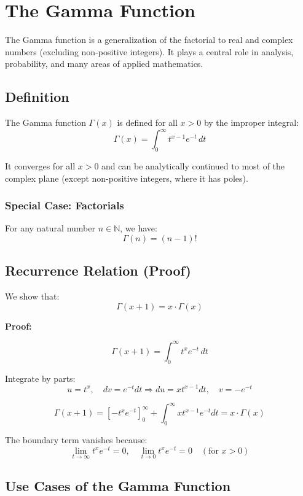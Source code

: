 \section{The Gamma Function}

The Gamma function is a generalization of the factorial to real and complex numbers (excluding non-positive integers). It plays a central role in analysis, probability, and many areas of applied mathematics.

\subsection{Definition}

The Gamma function \( \Gamma(x) \) is defined for all \( x > 0 \) by the improper integral:
\[
\Gamma(x) = \int_0^\infty t^{x-1} e^{-t} \,dt
\]

It converges for all \( x > 0 \) and can be analytically continued to most of the complex plane (except non-positive integers, where it has poles).

\subsubsection*{Special Case: Factorials}

For any natural number \( n \in \mathbb{N} \), we have:
\[
\Gamma(n) = (n - 1)!
\]

\subsection{Recurrence Relation (Proof)}

We show that:
\[
\Gamma(x + 1) = x \cdot \Gamma(x)
\]

\textbf{Proof:}

\[
\Gamma(x + 1) = \int_0^\infty t^x e^{-t} \,dt
\]

Integrate by parts:
\[
u = t^x, \quad dv = e^{-t} dt \Rightarrow du = x t^{x-1} dt, \quad v = -e^{-t}
\]

\[
\Gamma(x + 1) = \left[ -t^x e^{-t} \right]_0^\infty + \int_0^\infty x t^{x-1} e^{-t} dt = x \cdot \Gamma(x)
\]

The boundary term vanishes because:
\[
\lim_{t \to \infty} t^x e^{-t} = 0, \quad \lim_{t \to 0} t^x e^{-t} = 0 \quad (\text{for } x > 0)
\]

\subsection{Use Cases of the Gamma Function}

